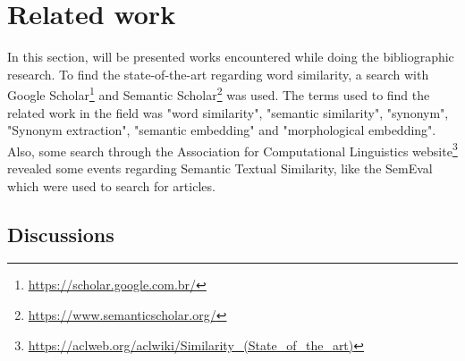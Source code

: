 




\section{Related work}\label{chap:relatedwork}

In this section, will be presented works encountered while doing the bibliographic research. To find the state-of-the-art regarding word similarity, a search with Google Scholar\footnote{\url{https://scholar.google.com.br/}} and Semantic Scholar\footnote{\url{https://www.semanticscholar.org/}} was used. The terms used to find the related work in the field was "word similarity", "semantic similarity", "synonym", "Synonym extraction", "semantic embedding" and "morphological embedding". Also, some search through the Association for Computational Linguistics website\footnote{\url{https://aclweb.org/aclwiki/Similarity_(State_of_the_art)}} revealed some events regarding Semantic Textual Similarity, like the SemEval which were used to search for articles.












\subsection{Discussions}

